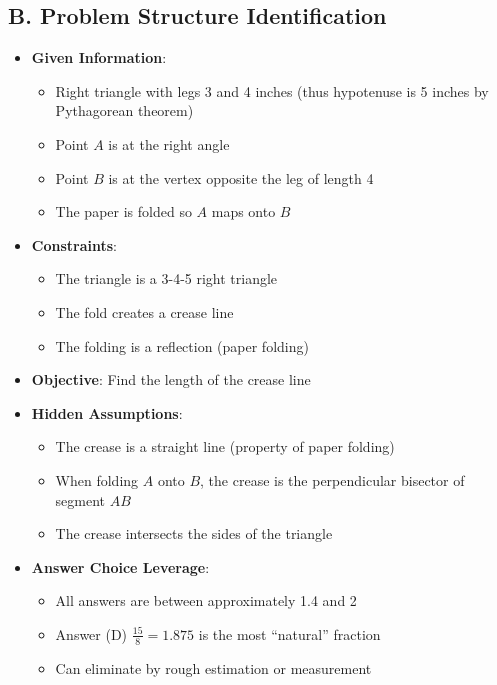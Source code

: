 \documentclass[12pt]{article}
\begin{document}
\begin{problemconfigbox}
\subsection*{B. Problem Structure Identification}
\begin{itemize}[leftmargin=*]
    \item \textbf{Given Information}: 
    \begin{itemize}
        \item Right triangle with legs 3 and 4 inches (thus hypotenuse is 5 inches by Pythagorean theorem)
        \item Point $A$ is at the right angle
        \item Point $B$ is at the vertex opposite the leg of length 4
        \item The paper is folded so $A$ maps onto $B$
    \end{itemize}
    \item \textbf{Constraints}: 
    \begin{itemize}
        \item The triangle is a 3-4-5 right triangle
        \item The fold creates a crease line
        \item The folding is a reflection (paper folding)
    \end{itemize}
    \item \textbf{Objective}: Find the length of the crease line
    \item \textbf{Hidden Assumptions}: 
    \begin{itemize}
        \item The crease is a straight line (property of paper folding)
        \item When folding $A$ onto $B$, the crease is the perpendicular bisector of segment $AB$
        \item The crease intersects the sides of the triangle
    \end{itemize}
    \item \textbf{Answer Choice Leverage}: 
    \begin{itemize}
        \item All answers are between approximately 1.4 and 2
        \item Answer (D) $\frac{15}{8} = 1.875$ is the most ``natural'' fraction
        \item Can eliminate by rough estimation or measurement
    \end{itemize}
\end{itemize}


\end{problemconfigbox}
\end{document}
